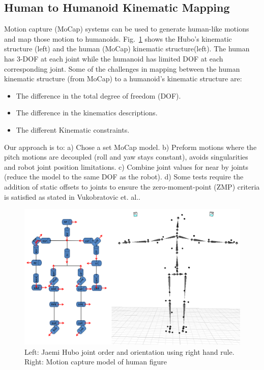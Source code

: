 \subsection{\bf Human to Humanoid Kinematic Mapping}\label{sec:sec:mocap}

Motion capture (MoCap) systems can be used to generate human-like motions and map those motion to humanoids\cite{1545060,Polland2002}.  
Fig.~\ref{fig:mocap-joints} shows the Hubo's kinematic structure (left) and the human (MoCap) kinematic structure(left).
The human has 3-DOF at each joint while the humanoid has limited DOF at each corresponding joint.
Some of the challenges in mapping between the human kinematic structure (from MoCap) to a humanoid's kinematic structure are:

\begin{itemize}
	\item The difference in the total degree of freedom (DOF). 
	\item	The difference in the kinematics descriptions. 
	\item	The different Kinematic constraints.
\end{itemize}

Our approach is to: 
a) Chose a set MoCap model.  
b) Preform motions where the pitch motions are decoupled (roll and yaw stays constant), avoids singularities and robot joint position limitations.  
c) Combine joint values for near by joints (reduce the model to the same DOF as the robot).  
d) Some tests require the addition of static offsets to joints to ensure the zero-moment-point (ZMP) criteria is satisfied as stated in Vukobratovic et. al.\cite{zmp35}.

\begin{figure}[t]
  \centering
\includegraphics[width=1.0\columnwidth]{./pix/mocapJoints.png}  \caption{Left: Jaemi Hubo joint order and orientation using right hand rule.  Right: Motion capture model of human figure}
  \label{fig:mocap-joints}
\end{figure}



